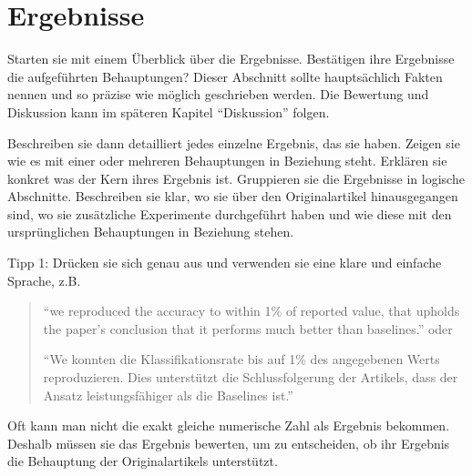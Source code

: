 \documentclass[DIV=13,fontsize=11pt]{scrartcl}
\begin{document}


\section{Ergebnisse}
Starten sie mit einem Überblick über die Ergebnisse.
Bestätigen ihre Ergebnisse die aufgeführten Behauptungen?
Dieser Abschnitt sollte hauptsächlich Fakten nennen und so präzise wie möglich geschrieben werden.
Die Bewertung und Diskussion kann im späteren Kapitel ``Diskussion'' folgen.


Beschreiben sie dann detailliert jedes einzelne Ergebnis, das sie haben.
Zeigen sie wie es mit einer oder mehreren Behauptungen in Beziehung steht.
Erklären sie konkret was der Kern ihres Ergebnis ist.
Gruppieren sie die Ergebnisse in logische Abschnitte.
Beschreiben sie klar, wo sie über den Originalartikel hinausgegangen sind, wo sie zusätzliche Experimente durchgeführt haben und wie diese mit den ursprünglichen Behauptungen in Beziehung stehen.


Tipp 1: Drücken sie sich genau aus und verwenden sie eine klare und einfache Sprache, z.B.
\begin{quote}
    ``we reproduced the accuracy to within 1\% of reported value, that upholds the paper's conclusion that it performs much better than baselines.'' oder

    ``We konnten die Klassifikationsrate bis auf 1\% des angegebenen Werts reproduzieren. Dies unterstützt die Schlussfolgerung der Artikels, dass der Ansatz leistungsfähiger als die Baselines ist.''
\end{quote}
Oft kann man nicht die exakt gleiche numerische Zahl als Ergebnis bekommen. Deshalb müssen sie das Ergebnis bewerten, um zu entscheiden, ob ihr Ergebnis die Behauptung der Originalartikels unterstützt.
\end{document}
